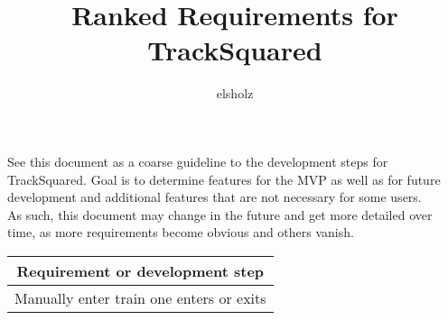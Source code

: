 \documentclass[a4paper,10pt]{article}
\begin{document}
\title{Ranked Requirements for TrackSquared}
\author{elsholz}
\maketitle
See this document as a coarse guideline to the development steps for TrackSquared.
Goal is to determine features for the MVP as well as for future development and
additional features that are not necessary for some users.\\
As such, this document may change in the future and get more detailed over time, as 
more requirements become obvious and others vanish.
\begin{table}[h!]
    \begin{center}
        \label{tab:table1}
        \begin{tabular}{c} %
        \textbf{Requirement or development step} \\
        \hline
        Manually enter train one enters or exits\\
        
        \end{tabular}
    \end{center}
\end{table}
\end{document}

